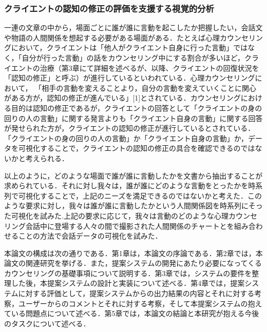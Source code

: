 \documentclass[shuuron]{kuee}
\begin{document}
\subsubsection{クライエントの認知の修正の評価を支援する視覚的分析}


一連の文章の中から，場面ごとに誰が誰に言動を起こしたか把握したい，会話文や物語の人間関係を想起する必要がある場面がある．たとえば心理カウンセリングにおいて，クライエントは「他人がクライエント自身に行った言動」ではなく，「自分が行った言動」の話をカウンセリング中にする割合が多いほど，クライエントの治療（第3章にて詳細を述べるが、以降、クライエントの回復状況を「認知の修正」と呼ぶ）が進行しているといわれている．心理カウンセリングにおいて， 「相手の言動を変えることより，自分の言動を変えていくことに関心がある方が，認知の修正が進んでいる」[1]とされている．カウンセリングにおける目的は認知の修正であるが，クライエントの回答として「クライエントの身の回りの人の言動」に関する発言よりも「クライエント自身の言動」に関する回答が発せられた方が，クライエントの認知の修正が進行しているとされている．「クライエントの身の回りの人の言動」か「クライエント自身の言動」か，データを可視化することで，クライエントの認知の修正の具合を確認できるのではないかと考えられる．

以上のように，どのような場面で誰が誰に言動したかを文書から抽出することが求められている．それに対し我々は，誰が誰にどのような言動をとったかを時系列で可視化することで，上記のニーズを満足できるのではないかと考えた．このような要求に対し，我々は誰が誰に言動したかという人間関係図を時系列にそった可視化を試みた.上記の要求に応じて，我々は言動のどのような心理カウンセリング会話中に登場する人々の間で撮影された人間関係のチャートとを組み合わせることの方法で会話データの可視化を試みた．

本論文の構成は次の通りである．第1章は，本論文の序論である．第2章では，本論文の関連研究を挙げる．また，提案システムの開発にあたり必要になってくるカウンセリングの基礎事項について説明する．第3章では，システムの要件を整理した後，本提案システムの設計と実装について述べる．第4章では，提案システムに対する評価として，提案システムからの出力結果の内容とそれに対する考察，ユーザーからのコメントとそれに対する考察，そして本提案システムの抱えている問題点について述べる．第5章では，本論文の結論と本研究が抱える今後のタスクについて述べる．
\end{document}
